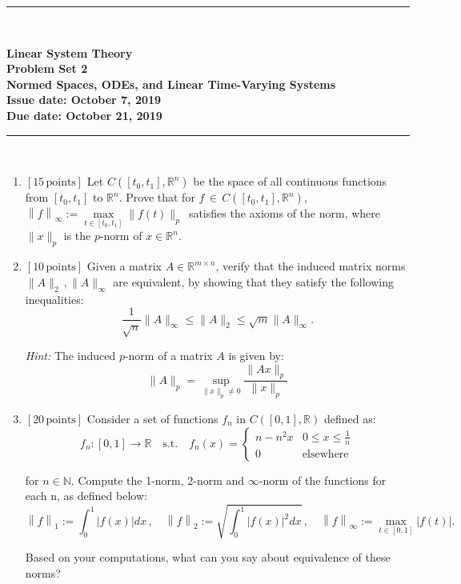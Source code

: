 \documentclass[a4paper,10.5pt]{article}
\newcommand{\R}{\mathbb{R}}
\newcommand{\N}{\mathbb{N}}
\begin{document}
\thispagestyle{plain}

\vspace*{-1.5cm}
\noindent \rule{15.8cm}{.3mm} \\[.3cm]
\begin{center} \bf
{\large Linear System Theory \medskip \\
Problem Set 2 \\
Normed Spaces, ODEs, and Linear Time-Varying Systems \medskip \\
Issue date: October 7, 2019 \\
Due date: October 21, 2019}
\end{center}
\rule{15.8cm}{.3mm} \\[0cm]

\begin{enumerate}
\item {\bf$[15\, \text{points}]$}
Let $C([t_0, t_1], \R^n)$ be the space of all continuous functions from $[t_0, t_1]$ to $\R^n$. Prove that for $f \, \in \, C([t_0, t_1], \R^n)$,
 $\left\lVert f \right\rVert_\infty := \max\limits_{t \in [t_0, t_1]} \|f(t)\|_p \, $ satisfies the axioms of the norm, where $\|x\|_p$ is the $p$-norm of $x \in \R^n$.
 
\item {\bf$[10\, \text{points}]$}
Given a matrix $A \in \R^{m \times n}$, verify that the induced matrix norms $\|A\|_2 \, ,\|A\|_\infty$ are equivalent, by showing that they satisfy the following inequalities:
\begin{displaymath}
\dfrac{1}{\sqrt{n}} \|A\|_\infty \leq \|A\|_2 \leq \sqrt{m} \|A\|_\infty.
\end{displaymath}

{\em Hint:} The induced $p$-norm of a matrix $A$ is given by:
\begin{displaymath}
\|A\|_p=\sup\limits_{\|x\|_p \neq 0} \dfrac{\|Ax\|_p}{\|x\|_p}
\end{displaymath}

\item {\bf$[20\, \text{points}]$}
Consider a set of functions $f_n$ in $C([0,1], \R)$ defined as:
\begin{displaymath}
f_n:[0,1] \rightarrow \R \quad\text{s.t.}\quad
f_n(x) = 
\begin{cases}
n -n^2x & 0\leq x\leq \frac{1}{n}\\
0 & \text{elsewhere}
\end{cases}
\end{displaymath}

for $n\in\N$. Compute the 1-norm, 2-norm and $\infty$-norm of the functions for each n, as defined below:
\begin{displaymath}
\left\lVert f \right\rVert_1 := \int_0^1 \left\lvert f(x) \right\rvert dx\, , \quad
\left\lVert f \right\rVert_2 := \sqrt{\int_0^1 \left\lvert f(x) \right\rvert^2 dx}\, , \quad
\left\lVert f \right\rVert_\infty := \max\limits_{t \in [0, 1]} |f(t)|.
\end{displaymath}

Based on your computations, what can you say about equivalence of these norms?  
\end{enumerate} 
\end{document}
